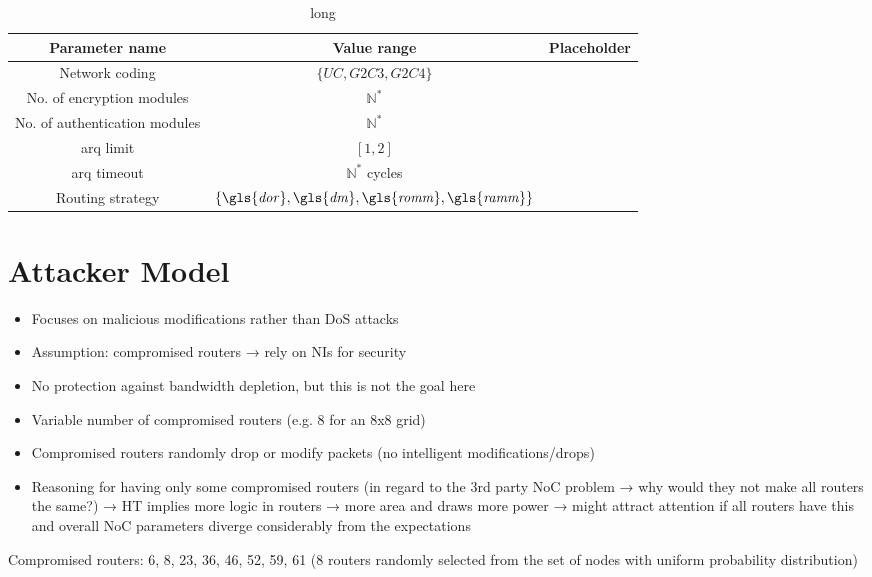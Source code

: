 \begin{table}
    \centering
    \begin{tabulary}{\textwidth}{C|C|C}
        Parameter name & Value range & Placeholder \\\hline
        Network coding & $\{\mathit{UC}, \mathit{G2C3}, \mathit{G2C4}\}$ & \pNCMode{} \\
        No. of encryption modules & $\mathbb{N}^*$ & \pEncMods{} \\
        No. of authentication modules & $\mathbb{N}^*$ & \pAuthMods{} \\
        \Gls{arq} limit & $[1, 2]$ & \pARQLimit{} \\
        \Gls{arq} timeout & $\mathbb{N}^*$ cycles & \pARQTimeout{} \\
        Routing strategy & $\{\mathit{\gls{dor}}, \mathit{\gls{dm}}, \mathit{\gls{romm}}, \mathit{\gls{ramm}}\}$ & \pRStrat{} \\
    \end{tabulary}
    \caption[short]{long}
    \label{tab:inputparams}
\end{table}

\section{Attacker Model}
\begin{itemize}
    \item Focuses on malicious modifications rather than DoS attacks
    \item Assumption: compromised routers → rely on NIs for security
    \item No protection against bandwidth depletion, but this is not the goal here
    \item Variable number of compromised routers (e.g. 8 for an 8x8 grid)
    \item Compromised routers randomly drop or modify packets (no intelligent modifications/drops)
    \item Reasoning for having only some compromised routers (in regard to the 3rd party NoC problem → why would they not make all routers the same?)
        → HT implies more logic in routers → more area and draws more power → might attract attention if all routers have this and overall NoC
        parameters diverge considerably from the expectations
\end{itemize}

Compromised routers: 6, 8, 23, 36, 46, 52, 59, 61 (8 routers randomly selected from the set of nodes with uniform probability distribution)


